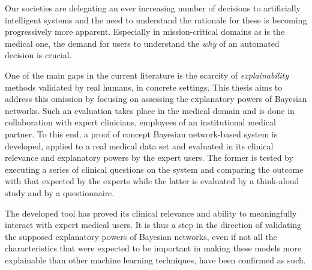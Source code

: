 Our societies are delegating an ever increasing number of decisions to artificially intelligent systems and the need to understand the rationale for these is becoming progressively more apparent.
Especially in mission-critical domains as is the medical one, the demand for users to understand the \textit{why} of an automated decision is crucial.

One of the main gaps in the current literature is the scarcity of \textit{explainability} methods validated by real humans, in concrete settings.
This thesis aims to address this omission by focusing on assessing the explanatory powers of Bayesian networks.
Such an evaluation takes place in the medical domain and is done in collaboration with expert clinicians, employees of an institutional medical partner.
To this end, a proof of concept Bayesian network-based system is developed, applied to a real medical data set and evaluated in its clinical relevance and explanatory powers by the expert users.
The former is tested by executing a series of clinical questions on the system and comparing the outcome with that expected by the experts while the latter is evaluated by a think-aloud study and by a questionnaire.

The developed tool has proved its clinical relevance and ability to meaningfully interact with expert medical users.
It is thus a step in the direction of validating the supposed explanatory powers of Bayesian networks, even if not all the characteristics that were expected to be important in making these models more explainable than other machine learning techniques, have been confirmed as such.
